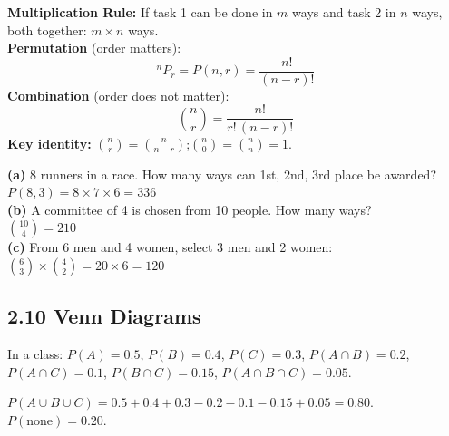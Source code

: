 \documentclass[12pt]{article}
\begin{document}
\begin{defbox}
\textbf{Multiplication Rule:} If task 1 can be done in $m$ ways and task 2 in $n$ ways, both together: $m\times n$ ways.\\[4pt]
\textbf{Permutation} (order matters):
\[{}^nP_r = P(n,r) = \frac{n!}{(n-r)!}\]
\textbf{Combination} (order does not matter):
\[\binom{n}{r} = \frac{n!}{r!\,(n-r)!}\]
\textbf{Key identity:} $\binom{n}{r}=\binom{n}{n-r}$;\quad $\binom{n}{0}=\binom{n}{n}=1$.
\end{defbox}

\begin{examplebox}
\textbf{(a)} 8 runners in a race. How many ways can 1st, 2nd, 3rd place be awarded?\\
$P(8,3)=8\times7\times6=336$\\[4pt]
\textbf{(b)} A committee of 4 is chosen from 10 people. How many ways?\\
$\binom{10}{4}=210$\\[4pt]
\textbf{(c)} From 6 men and 4 women, select 3 men and 2 women:
$\binom{6}{3}\times\binom{4}{2}=20\times6=120$
\end{examplebox}

\subsection{2.10 Venn Diagrams}

\begin{examplebox}
In a class: $P(A)=0.5$, $P(B)=0.4$, $P(C)=0.3$, $P(A\cap B)=0.2$, $P(A\cap C)=0.1$, $P(B\cap C)=0.15$, $P(A\cap B\cap C)=0.05$.\\[6pt]
\begin{center}
\end{center}
$P(A\cup B\cup C)=0.5+0.4+0.3-0.2-0.1-0.15+0.05=0.80$.\; $P(\text{none})=0.20$.
\end{examplebox}
\end{document}
